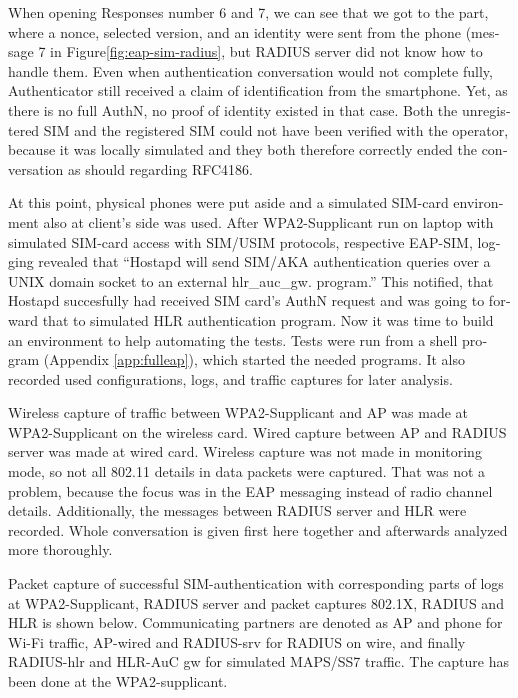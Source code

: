 \documentclass[12pt,a4paper,english]{tutthesis}
\begin{document}
\begin{otherlanguage}{english}
When opening Responses number 6 and 7, we can see that we got to the
part, where a nonce, selected version, and an identity were sent from
the phone (message 7 in Figure\ref{fig:eap-sim-radius}, but RADIUS server
did not know how to handle them.
 Even when authentication conversation would not complete fully,
Authenticator still received a claim of identification from the
smartphone. Yet, as there is no full AuthN, no proof of identity existed in
that case.
Both the unregistered SIM and the registered SIM could not have been
verified with the
operator, because it was locally simulated and they both therefore
correctly  ended the conversation as should regarding
RFC4186\cite{rfc4186}.

At this point, physical phones were put aside and a simulated SIM-card
environment also at client's  side was used.
After WPA2-Supplicant run on laptop with simulated SIM-card access 
with SIM/USIM protocols, respective EAP-SIM, logging revealed that
``Hostapd will send SIM/AKA authentication queries over a UNIX domain socket to an external hlr\_auc\_gw.
program.''
This notified, that Hostapd succesfully had received SIM
card's AuthN request and was going to forward that to simulated HLR
authentication program. Now it was time to build an
environment to help automating the tests.
Tests were run from a shell program (Appendix \ref{app:fulleap}), which
started the needed programs. It also recorded used configurations, logs,
and traffic captures for later analysis.



Wireless capture of traffic between WPA2-Supplicant and AP was made at
WPA2-Supplicant on the wireless card. Wired capture between AP and
RADIUS server was made at wired card. Wireless capture was
not made in monitoring mode, so not all 802.11 details in
data packets were captured\cite{wireshark-capture}.
That was not a problem, because the focus was 
in the EAP messaging instead of radio channel details.
Additionally, the messages between RADIUS server and HLR were recorded.
Whole conversation is given first here together and afterwards analyzed more
thoroughly.



Packet capture of successful SIM-authentication with corresponding
parts of logs at WPA2-Supplicant, RADIUS server and packet captures
802.1X, RADIUS and HLR is shown below.  Communicating partners are
denoted as AP and phone for Wi-Fi traffic, AP-wired and
RADIUS-srv for RADIUS on wire, and finally RADIUS-hlr and HLR-AuC gw
for simulated MAPS/SS7 traffic.
The capture has been done at the WPA2-supplicant.


\end{otherlanguage}
\end{document}

